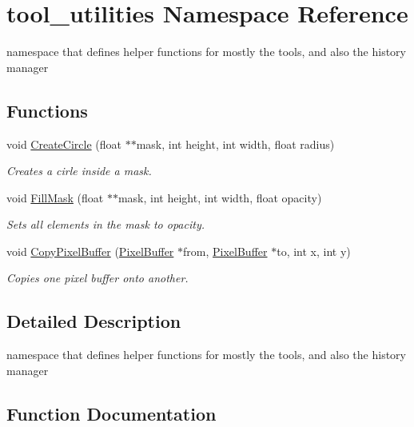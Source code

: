 \hypertarget{namespacetool__utilities}{}\section{tool\+\_\+utilities Namespace Reference}
\label{namespacetool__utilities}


namespace that defines helper functions for mostly the tools, and also the history manager  


\subsection*{Functions}
\begin{DoxyCompactItemize}
\item 
void \hyperlink{namespacetool__utilities_a9f54b46e90a47c7f7fb1af62ef7ae46e}{Create\+Circle} (float $\ast$$\ast$mask, int height, int width, float radius)
\begin{DoxyCompactList}\small\item\em Creates a cirle inside a mask. \end{DoxyCompactList}\item 
void \hyperlink{namespacetool__utilities_ad06418c23ea570d7f905ebd6accd97d5}{Fill\+Mask} (float $\ast$$\ast$mask, int height, int width, float opacity)
\begin{DoxyCompactList}\small\item\em Sets all elements in the mask to opacity. \end{DoxyCompactList}\item 
void \hyperlink{namespacetool__utilities_aae8a6ceb9b492384c8240670e165d8df}{Copy\+Pixel\+Buffer} (\hyperlink{classimage__tools_1_1PixelBuffer}{Pixel\+Buffer} $\ast$from, \hyperlink{classimage__tools_1_1PixelBuffer}{Pixel\+Buffer} $\ast$to, int x, int y)
\begin{DoxyCompactList}\small\item\em Copies one pixel buffer onto another. \end{DoxyCompactList}\end{DoxyCompactItemize}


\subsection{Detailed Description}
namespace that defines helper functions for mostly the tools, and also the history manager 

\subsection{Function Documentation}
